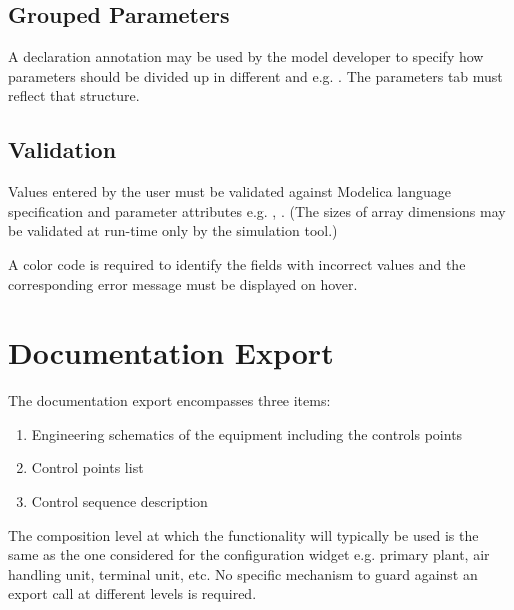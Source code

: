 \documentclass[letterpaper,10pt, openany,english]{sphinxmanual}
\begin{document}
\subsection{Grouped Parameters}
\label{\detokenize{requirements:grouped-parameters}}
A declaration annotation may be used by the model developer to specify how parameters should be divided up in different  and  e.g. . The parameters tab must reflect that structure.


\subsection{Validation}
\label{\detokenize{requirements:validation}}
Values entered by the user must be validated  against Modelica language specification  and parameter attributes e.g. , . (The sizes of array dimensions may be validated at run-time only by the simulation tool.)

A color code is required to identify the fields with incorrect values and the corresponding error message must be displayed on hover.


\section{Documentation Export}
\label{\detokenize{requirements:documentation-export}}\label{\detokenize{requirements:sec-documentation-export}}
The documentation export encompasses three items:
\begin{enumerate}
%
\item {} 
Engineering schematics of the equipment including the controls points

\item {} 
Control points list

\item {} 
Control sequence description

\end{enumerate}

The composition level at which the functionality will typically be used is the same as the one considered for the configuration widget e.g. primary plant, air handling unit, terminal unit, etc. No specific mechanism to guard against an export call at different levels is required.
\end{document}
